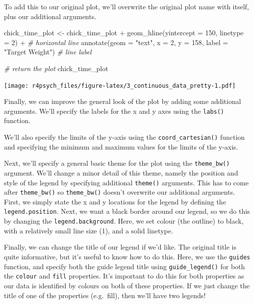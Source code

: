 \documentclass[
]{book}
\newenvironment{Shaded}{\begin{snugshade}}{\end{snugshade}}
\newcommand{\AttributeTok}[1]{\textcolor[rgb]{0.77,0.63,0.00}{#1}}
\newcommand{\CommentTok}[1]{\textcolor[rgb]{0.56,0.35,0.01}{\textit{#1}}}
\newcommand{\DecValTok}[1]{\textcolor[rgb]{0.00,0.00,0.81}{#1}}
\newcommand{\FunctionTok}[1]{\textcolor[rgb]{0.00,0.00,0.00}{#1}}
\newcommand{\NormalTok}[1]{#1}
\newcommand{\OtherTok}[1]{\textcolor[rgb]{0.56,0.35,0.01}{#1}}
\newcommand{\SpecialCharTok}[1]{\textcolor[rgb]{0.00,0.00,0.00}{#1}}
\newcommand{\StringTok}[1]{\textcolor[rgb]{0.31,0.60,0.02}{#1}}
\begin{document}
To add this to our original plot, we'll overwrite the original plot name with itself, plus our additional arguments.

\begin{Shaded}
\begin{Highlighting}[]
\NormalTok{chick\_time\_plot }\OtherTok{\textless{}{-}}\NormalTok{ chick\_time\_plot }\SpecialCharTok{+}
  \FunctionTok{geom\_hline}\NormalTok{(}\AttributeTok{yintercept =} \DecValTok{150}\NormalTok{, }\AttributeTok{linetype =} \DecValTok{2}\NormalTok{) }\SpecialCharTok{+} \CommentTok{\# horizontal line}
  \FunctionTok{annotate}\NormalTok{(}\AttributeTok{geom =} \StringTok{"text"}\NormalTok{, }\AttributeTok{x =} \DecValTok{2}\NormalTok{, }\AttributeTok{y =} \DecValTok{158}\NormalTok{, }\AttributeTok{label =} \StringTok{"Target Weight"}\NormalTok{) }\CommentTok{\# line label}

\CommentTok{\# return the plot}
\NormalTok{chick\_time\_plot}
\end{Highlighting}
\end{Shaded}

\texttt{[image: r4psych\_files/figure-latex/3\_continuous\_data\_pretty-1.pdf]}

Finally, we can improve the general look of the plot by adding some additional arguments. We'll specify the labels for the x and y axes using the \texttt{labs()} function.

We'll also specify the limits of the y-axis using the \texttt{coord\_cartesian()} function and specifying the minimum and maximum values for the limits of the y-axis.

Next, we'll specify a general basic theme for the plot using the \texttt{theme\_bw()} argument. We'll change a minor detail of this theme, namely the position and style of the legend by specifying additional \texttt{theme()} arguments. This has to come after \texttt{theme\_bw()} so \texttt{theme\_bw()} doesn't overwrite our additional arguments. First, we simply state the x and y locations for the legend by defining the \texttt{legend.position}. Next, we want a black border around our legend, so we do this by changing the \texttt{legend.background}. Here, we set colour (the outline) to black, with a relatively small line size (1), and a solid linetype.

Finally, we can change the title of our legend if we'd like. The original title is quite informative, but it's useful to know how to do this. Here, we use the \texttt{guides} function, and specify both the guide legend title using \texttt{guide\_legend()} for both the \texttt{colour} and \texttt{fill} properties. It's important to do this for both properties as our data is identified by colours on both of these properties. If we just change the title of one of the properties (e.g.~fill), then we'll have two legends!
\end{document}
